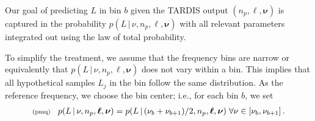 \documentclass[11pt]{article}
\newcommand{\fred}[1]{\todo[color=orange!40,inline]{#1}} %
\newcommand{\lleq}[1]{\label{#1} }
\renewcommand{\lleq}[1]{\label{#1} {\scriptstyle {\rm (#1)}} \hspace*{2ex} }
\newcommand{\cond}{\,|\,}
\newcommand{\bml}{{\bm{\ell}}}
\newcommand{\bmphi}{{\bm{\phi}}}
\newcommand{\bmnu}{{\bm{\nu}}}
\newcommand{\npack}{n_p}
\begin{document}


Our goal of predicting $L$ in bin $b$ given the TARDIS output
$(\npack,\bml, \bmnu)$ is captured in the probability $p(L\cond \nu,
\npack,\bml, \bmnu)$ with all relevant parameters integrated out using
the law of total probability.

To simplify the treatment, we assume that the frequency bins are
narrow or equivalently that $p(L \cond \nu, \npack, \bml, \bmnu)$ does
not vary within a bin. This implies that all hypothetical samples
$L_j$ in the bin follow the same distribution.  As the reference
frequency, we choose the bin center;
i.e., for each bin $b$, we set
\begin{align}
  \lleq{pmq}
  p(L\cond \nu, \npack,\bml, \bmnu) = p(L\cond (\nu_b + \nu_{b+1}) / 2, \npack,\bml, \bmnu)  \; \forall \nu \in [\nu_b, \nu_{b+1}] \, .
\end{align}
\end{document}
